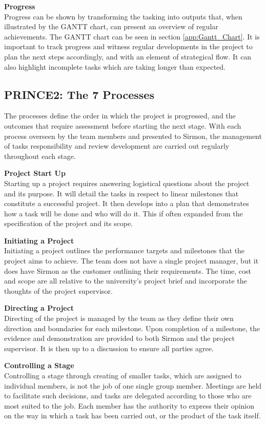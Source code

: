 \documentclass [12pt]{article}
\begin{document}
\textbf{Progress}\\
Progress can be shown by transforming the tasking into outputs that, when illustrated by the GANTT chart, can present an overview of regular achievements. The GANTT chart can be seen in section \ref{app:Gantt_Chart}. It is important to track progress and witness regular developments in the project to plan the next steps accordingly, and with an element of strategical flow. It can also highlight incomplete tasks which are taking longer than expected.

\subsection{PRINCE2: The 7 Processes}\label{sec:7_processes}
The processes define the order in which the project is progressed, and the outcomes that require assessment before starting the next stage. With each process overseen by the team members and presented to Sirmon, the management of tasks responsibility and review development are carried out regularly throughout each stage.

\textbf{Project Start Up}\\
Starting up a project requires answering logistical questions about the project and its purpose. It will detail the tasks in respect to linear milestones that constitute a successful project. It then develops into a plan that demonstrates how a task will be done and who will do it. This if often expanded from the specification of the project and its scope.

\textbf{Initiating a Project}\\
Initiating a project outlines the performance targets and milestones that the project aims to achieve. The team does not have a single project manager, but it does have Sirmon as the customer outlining their requirements. The time, cost and scope are all relative to the university’s project brief and incorporate the thoughts of the project supervisor.

\textbf{Directing a Project}\\
Directing of the project is managed by the team as they define their own direction and boundaries for each milestone. Upon completion of a milestone, the evidence and demonstration are provided to both Sirmon and the project supervisor. It is then up to a discussion to ensure all parties agree.

\textbf{Controlling a Stage}\\
Controlling a stage through creating of smaller tasks, which are assigned to individual members, is not the job of one single group member. Meetings are held to facilitate such decisions, and tasks are delegated according to those who are most suited to the job. Each member has the authority to express their opinion on the way in which a task has been carried out, or the product of the task itself.
\end{document}
